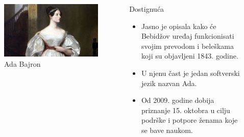 \documentclass[aspectratio=169]{beamer}
\begin{document}
\begin{frame}
    \begin{columns}
        \begin{figure}[h]
    \centering
    \includegraphics[width = .9\textwidth]{adabajron.jpg}
    \caption{Ada Bajron}
    \label{fig:my_label}
\end{figure}

        \begin{block}{Dostignuća}
            \begin{itemize}
                \item<1-> Jasno je opisala kako će Bebidžov uređaj funkcionisati svojim prevodom i beleškama koji su objavljeni 1843. godine.

                \item<2-> U njenu čast je jedan softverski jezik nazvan Ada.

                \item<3-> Od 2009. godine dobija priznanje 15. oktobra u cilju podrške i potpore ženama koje se bave naukom.
                
            \end{itemize}
        \end{block}        
    \end{columns}
   
\end{frame}
    

\end{document}
